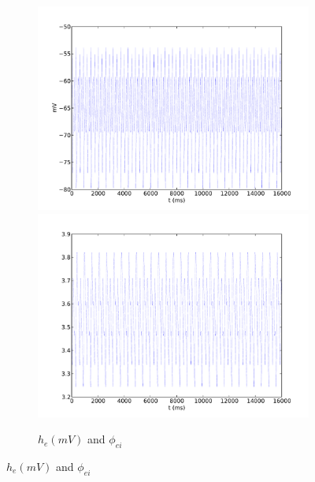 \documentclass[a4paper,12pt]{article}
\begin{document}
\begin{figure}
	\begin{subfigure}[b]{1\textwidth}
		\includegraphics[scale=0.32]{chosen-frontiers-2012/00214-1-0_1-5-0_2-he-phi.pdf}
		\includegraphics[scale=0.32]{chosen-frontiers-2012/00214-1-0_1-5-0_2-phi_ei-phi}
		\caption{$h_e (mV)$ and $\phi_{ei}$}
	\end{subfigure}


\end{figure}
\end{document}
